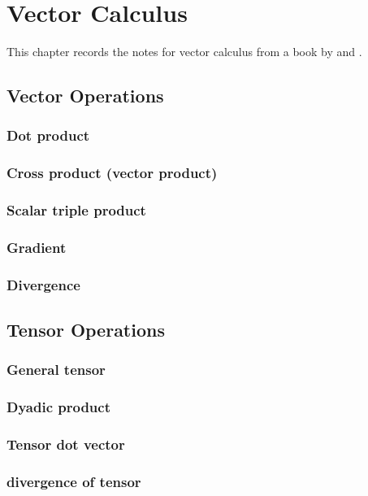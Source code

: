 \chapter{Vector Calculus}
This chapter records the notes for vector calculus from a book by \citet{matthews1998vector} and \citet{moukalled2016finite}.

\section{Vector Operations}
\subsection{Dot product}

\subsection{Cross product (vector product)}

\subsection{Scalar triple product}

\subsection{Gradient}

\subsection{Divergence}

\section{Tensor Operations}
\subsection{General tensor}

\subsection{Dyadic product}

\subsection{Tensor dot vector}

\subsection{divergence of tensor}

